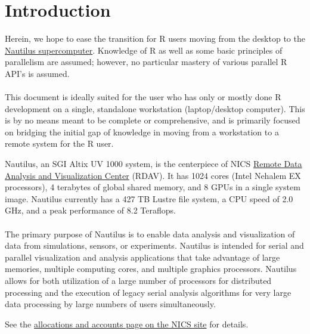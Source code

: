 \section{Introduction}

Herein, we hope to ease the transition for R users moving from the desktop to the \href{http://www.nics.tennessee.edu/computing-resources/nautilus}{Nautilus supercomputer}.  Knowledge of R as well as some basic principles of parallelism are assumed; however, no particular mastery of various parallel R API's is assumed.  \\\\
%
%
This document is ideally suited for the user who has only or mostly done R development on a single, standalone workstation (laptop/desktop computer).  This is by no means meant to be complete or comprehensive, and is primarily focused on bridging the initial gap of knowledge in moving from a workstation to a remote system for the R user.


Nautilus, an SGI Altix UV 1000 system, is the centerpiece of NICS \href{http://rdav.nics.tennessee.edu/}{Remote Data Analysis and Visualization Center} (RDAV). It has 1024 cores (Intel Nehalem EX processors), 4 terabytes of global shared memory, and 8 GPUs in a single system image. Nautilus currently has a 427 TB Lustre file system, a CPU speed of 2.0 GHz, and a peak performance of 8.2 Teraflops.\\\\
%
The primary purpose of Nautilus is to enable data analysis and visualization of data from simulations, sensors, or experiments. Nautilus is intended for serial and parallel visualization and analysis applications that take advantage of large memories, multiple computing cores, and multiple graphics processors. Nautilus allows for both utilization of a large number of processors for distributed processing and the execution of legacy serial analysis algorithms for very large data processing by large numbers of users simultaneously.   

  \label{getacct}
See the \href{http://www.nics.tennessee.edu/getting-started/accounts}{allocations and accounts page on the NICS site} for details.